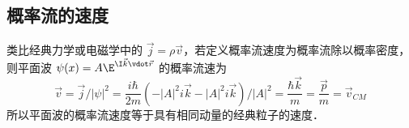 \subsection{概率流的速度}

类比经典力学或电磁学中的 $\vec j = \rho \vec v$，若定义概率流速度为概率流除以概率密度，则平面波 $\psi (x) = A{\E^{\I \vec k \vdot \vec r}}$ 的概率流速为
\begin{equation}
\vec v = \vec j/{\left| \psi  \right|^2} = \frac{{i\hbar }}{{2m}}\left( { - {{\left| A \right|}^2}i\vec k - {{\left| A \right|}^2}i\vec k} \right)/{\left| A \right|^2} = \frac{{\hbar \vec k}}{m} = \frac{{\vec p}}{m} = {\vec v_{CM}}
\end{equation}
所以平面波的概率流速度等于具有相同动量的经典粒子的速度．
